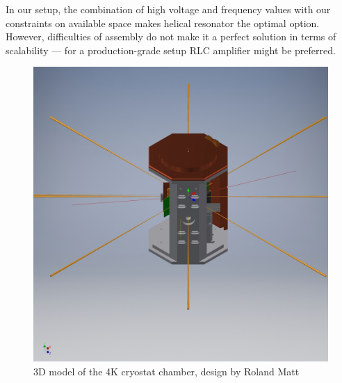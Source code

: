 In our setup, the combination of high voltage and frequency values with our constraints on available space makes helical resonator the optimal option. However, difficulties of assembly do not make it a perfect solution in terms of scalability --- for a production-grade setup RLC amplifier might be preferred.

\begin{figure}[h]
	\includegraphics[width=\textwidth]{images/4K_chamber}
	\caption{3D model of the 4K cryostat chamber, design by Roland Matt}
	\label{fig:4K_chamber}
\end{figure}